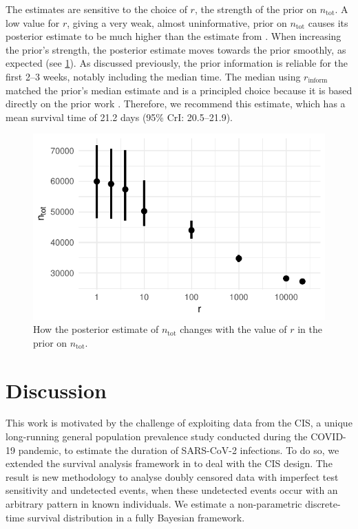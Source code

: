 \documentclass[12pt]{article}
\newcommand{\ntot}{n_\text{tot}}
\newcommand{\inform}{{_{\text{inform}}}}
\begin{document}
The estimates are sensitive to the choice of $r$, the strength of the prior on $\ntot$.
A low value for $r$, giving a very weak, almost uninformative, prior on $\ntot$ causes its posterior estimate to be much higher than the estimate from \citet{birrellRTM2}.
When increasing the prior's strength, the posterior estimate moves towards the prior smoothly, as expected (see \cref{imperf-test:fig:ntot}).
As discussed previously, the prior information is reliable for the first 2--3 weeks, notably including the median time.
The median using $r\inform$ matched the prior's median estimate and is a principled choice because it is based directly on the prior work \citet{birrellRTM2}.
Therefore, we recommend this estimate, which has a mean survival time of 21.2 days (95\% CrI: 20.5--21.9).
\begin{figure}
  \centering \includegraphics{figures/output/CIS_ntot}
  \caption[Sensitivity of $\ntot$'s posterior to its prior.]{How the posterior estimate of $\ntot$ changes with the value of $r$ in the prior on $\ntot$.}
  \label{imperf-test:fig:ntot}
\end{figure}


\section{Discussion} \label{sec:discussion}

This work is motivated by the challenge of exploiting data from the CIS, a unique long-running general population prevalence study conducted during the COVID-19 pandemic, to estimate the duration of SARS-CoV-2 infections.
To do so, we extended the survival analysis framework in \citet{heiseyModelling} to deal with the CIS design.
The result is new methodology to analyse doubly censored data with imperfect test sensitivity and undetected events, when these undetected events occur with an arbitrary pattern in known individuals.
We estimate a non-parametric discrete-time survival distribution in a fully Bayesian framework.
\end{document}
